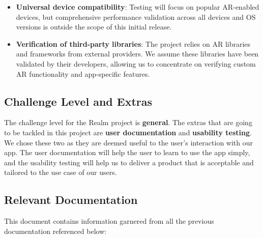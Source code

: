 \documentclass[12pt, titlepage]{article}
\begin{document}
\begin{itemize}
  \item \textbf{Universal device compatibility}: Testing will focus on popular AR-enabled devices, but comprehensive performance validation across all devices and OS versions is outside the scope of this initial release. \\

  \item \textbf{Verification of third-party libraries}: The project relies on AR libraries and frameworks from external providers. We assume these libraries have been validated by their developers, allowing us to concentrate on verifying custom AR functionality and app-specific features. \\
\end{itemize}

\subsection{Challenge Level and Extras}

The challenge level for the Realm project is \textbf{general}. The extras that are going to be tackled in this project are \textbf{user documentation} and \textbf{usability testing}. We chose these two as they are deemed useful to the user's interaction with our app. The user documentation will help the user to learn to use the app simply, and the usability testing will help us to deliver a product that is acceptable and tailored to the use case of our users.

\subsection{Relevant Documentation}

This document contains information garnered from all the previous documentation referenced below:

\begingroup
\raggedright
\renewcommand{\refname}{}
\printbibliography
\endgroup
\end{document}
